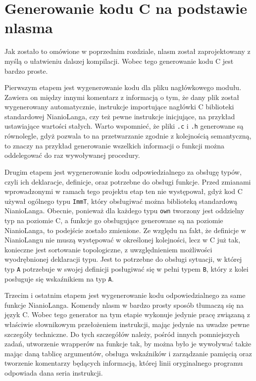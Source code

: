 \documentclass[licencjacka]{pracamgr}
\begin{document}
\section{Generowanie kodu C na podstawie nlasma}
Jak zostało to omówione w poprzednim rozdziale, nlasm został zaprojektowany z myślą o ułatwieniu dalszej kompilacji. Wobec tego generowanie
kodu C jest bardzo proste.


Pierwszym etapem jest wygenerowanie kodu dla pliku nagłówkowego modułu. Zawiera on między innymi komentarz z informacją o tym, że dany plik został
wygenerowany automatycznie, instrukcje importujące nagłówki C biblioteki standardowej NianioLanga, czy też pewne instrukcje inicjujące, na przykład
ustawiające wartości stałych. Warto wspomnieć, że pliki \texttt{.c} i \texttt{.h} generowane są równolegle, gdyż pozwala to na przetwarzanie zgodnie z
kolejnością semantyczną, to znaczy na przykład generowanie wszelkich informacji o funkcji można oddelegować do raz wywoływanej procedury.


Drugim etapem jest wygenerowanie kodu odpowiedzialnego za obsługę typów, czyli ich deklaracje, definicje, oraz potrzebne do obsługi funkcje. Przed
zmianami wprowadzonymi w ramach tego projektu etap ten nie występował, gdyż kod C używał ogólnego typu \texttt{ImmT}, który obsługiwać można
biblioteką standardową NianioLanga. Obecnie, ponieważ dla każdego typu \texttt{own} tworzony jest oddzielny typ na poziomie C, a funkcje go
obsługujące generowane są na poziomie NianioLanga, to podejście zostało zmienione. Ze względu na fakt, że definicje w NianioLangu nie muszą występować
w określonej kolejności, lecz w C już tak, konieczne jest sortowanie topologiczne, z uwzględnieniem możliwości wyodrębnionej deklaracji typu. Jest to
potrzebne do obsługi sytuacji, w której typ \texttt{A} potrzebuje w swojej definicji posługiwać się w pełni typem \texttt{B}, który z kolei posługuje
się wskaźnikiem na typ \texttt{A}.


Trzecim i ostatnim etapem jest wygenerowanie kodu odpowiedzialnego za same funkcje NianioLanga. Komendy nlasm w bardzo prosty sposób tłumaczą się na
język C.
Wobec tego generator na tym etapie wykonuje jedynie pracę związaną z właściwie słownikowym przełożeniem instrukcji,
mając jedynie na uwadze pewne szczegóły techniczne. Do tych szczegółów należy, pośród innych pomniejszych zadań, utworzenie wrapperów na funkcje tak,
by można było je wywoływać także mając daną tablicę argumentów, obsługa wskaźników i zarządzanie pamięcią oraz tworzenie komentarzy będących
informacją, której linii oryginalnego programu odpowiada dana seria instrukcji.
\end{document}
